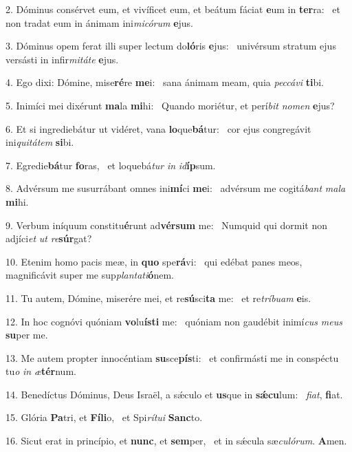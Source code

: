 2. Dóminus consérvet eum, et vivíficet eum, et beátum fáciat \textbf{e}um in \textbf{ter}ra: \ast\  et non tradat eum in ánimam ini\textit{mi}\textit{có}\textit{rum} \textbf{e}jus.\

3. Dóminus opem ferat illi super lectum do\textbf{ló}ris \textbf{e}jus: \ast\  univérsum stratum ejus versásti in infir\textit{mi}\textit{tá}\textit{te} \textbf{e}jus.\

4. Ego dixi: Dómine, mise\textbf{ré}re \textbf{me}i: \ast\  sana ánimam meam, quia \textit{pec}\textit{cá}\textit{vi} \textbf{ti}bi.\

5. Inimíci mei dixérunt \textbf{ma}la \textbf{mi}hi: \ast\  Quando moriétur, et perí\textit{bit} \textit{no}\textit{men} \textbf{e}jus?\

6. Et si ingrediebátur ut vidéret, vana \textbf{lo}que\textbf{bá}tur: \ast\  cor ejus congregávit ini\textit{qui}\textit{tá}\textit{tem} \textbf{si}bi.\

7. Egredie\textbf{bá}tur \textbf{fo}ras, \ast\  et loquebá\textit{tur} \textit{in} \textit{id}\textbf{íp}sum.\

8. Advérsum me susurrábant omnes ini\textbf{mí}ci \textbf{me}i: \ast\  advérsum me cogitá\textit{bant} \textit{ma}\textit{la} \textbf{mi}hi.\

9. Verbum iníquum constitu\textbf{é}runt ad\textbf{vér}\textbf{sum} me: \ast\  Numquid qui dormit non adjíci\textit{et} \textit{ut} \textit{re}\textbf{súr}gat?\

10. Etenim homo pacis meæ, in \textbf{quo} spe\textbf{rá}vi: \ast\  qui edébat panes meos, magnificávit super me sup\textit{plan}\textit{ta}\textit{ti}\textbf{ó}nem.\

11. Tu autem, Dómine, miserére mei, et re\textbf{sú}sci\textbf{ta} me: \ast\  et re\textit{trí}\textit{bu}\textit{am} \textbf{e}is.\

12. In hoc cognóvi quóniam \textbf{vo}lu\textbf{ís}\textbf{ti} me: \ast\  quóniam non gaudébit inimí\textit{cus} \textit{me}\textit{us} \textbf{su}per me.\

13. Me autem propter innocéntiam \textbf{su}sce\textbf{pís}ti: \ast\  et confirmásti me in conspéctu tu\textit{o} \textit{in} \textit{æ}\textbf{tér}num.\

14. Benedíctus Dóminus, Deus Israël, a sǽculo et \textbf{us}que in \textbf{sǽ}\textbf{cu}lum: \ast\  \textit{fi}\textit{at}, \textbf{fi}at.\

15. Glória \textbf{Pa}tri, et \textbf{Fí}\textbf{li}o, \ast\  et Spi\textit{rí}\textit{tu}\textit{i} \textbf{Sanc}to.\

16. Sicut erat in princípio, et \textbf{nunc}, et \textbf{sem}per, \ast\  et in sǽcula sæ\textit{cu}\textit{ló}\textit{rum}. \textbf{A}men.\

